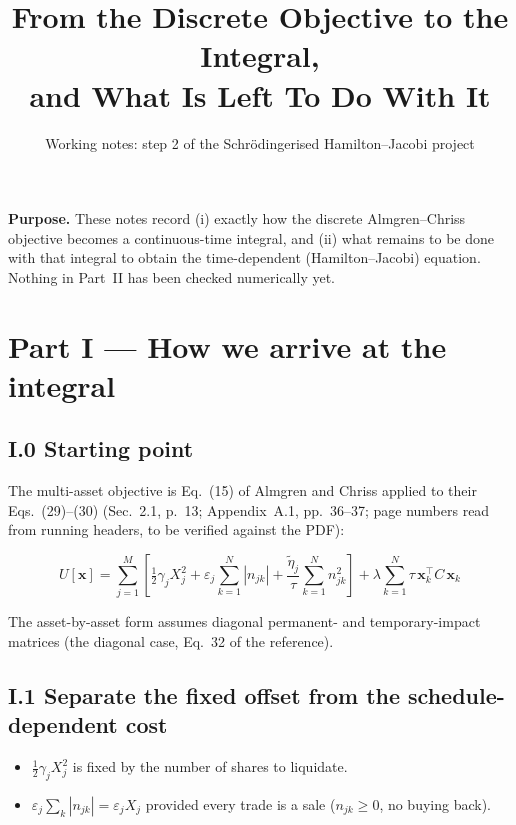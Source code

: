\documentclass[11pt,a4paper]{article}
\title{From the Discrete Objective to the Integral,\\and What Is Left To Do With It}
\author{Working notes: step 2 of the Schr\"odingerised Hamilton--Jacobi project}
\date{}
\begin{document}
\maketitle

\noindent\textbf{Purpose.} These notes record (i) exactly how the discrete
Almgren--Chriss objective becomes a continuous-time integral, and (ii) what
remains to be done with that integral to obtain the time-dependent
(Hamilton--Jacobi) equation. Nothing in Part~II has been checked numerically yet.

\section*{Part I --- How we arrive at the integral}

\subsection*{I.0 Starting point}

The multi-asset objective is Eq.~(15) of Almgren and Chriss applied to their
Eqs.~(29)--(30) (Sec.~2.1, p.~13; Appendix~A.1, pp.~36--37; page numbers read
from running headers, to be verified against the PDF):

\begin{equation}
  U[\mathbf{x}]
  = \sum_{j=1}^{M}\left[
      \tfrac{1}{2}\gamma_j X_j^2
      + \varepsilon_j \sum_{k=1}^{N}|n_{jk}|
      + \frac{\tilde{\eta}_j}{\tau}\sum_{k=1}^{N} n_{jk}^2
    \right]
  + \lambda \sum_{k=1}^{N} \tau\,\mathbf{x}_k^\top C\,\mathbf{x}_k
  \label{eq:disc}
\end{equation}

The asset-by-asset form assumes diagonal permanent- and temporary-impact
matrices (the diagonal case, Eq.~32 of the reference).

\subsection*{I.1 Separate the fixed offset from the schedule-dependent cost}

\begin{itemize}[leftmargin=1.5em]
  \item $\tfrac12\gamma_jX_j^2$ is fixed by the number of shares to liquidate.
  \item $\varepsilon_j\sum_k|n_{jk}|=\varepsilon_jX_j$ provided every trade is a
        sale ($n_{jk}\ge0$, no buying back).
\end{itemize}
\end{document}
